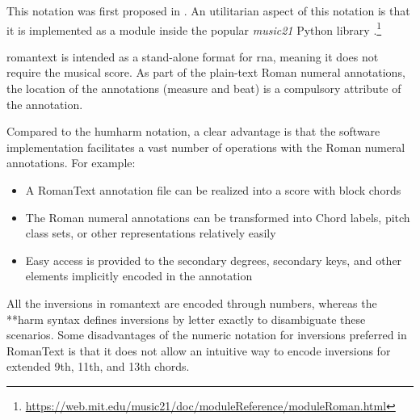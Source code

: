 

This notation was first proposed in
\textcite{gotham2019romantext}. An utilitarian aspect of
this notation is that it is implemented as a module inside
the popular \emph{music21} Python library
\parencite{cuthbert2010music21}.\footnote{\href{https://web.mit.edu/music21/doc/moduleReference/moduleRoman.html}{https://web.mit.edu/music21/doc/moduleReference/moduleRoman.html}}


\gls{romantext} is intended as a stand-alone format for
\gls{rna}, meaning it does not require the musical score. As
part of the plain-text Roman numeral annotations, the
location of the annotations (measure and beat) is a
compulsory attribute of the annotation.

Compared to the \gls{humharm} notation, a clear advantage is
that the software implementation facilitates a vast number
of operations with the Roman numeral annotations. For
example:

\begin{itemize}
    \item A RomanText annotation file can be realized into a
    score with block chords
    \item The Roman numeral annotations can be transformed
    into Chord labels, pitch class sets, or other
    representations relatively easily
    \item Easy access is provided to the secondary degrees,
    secondary keys, and other elements implicitly encoded in
    the annotation
\end{itemize}

All the inversions in \gls{romantext} are encoded through
numbers, whereas the **harm syntax defines inversions by
letter exactly to disambiguate these scenarios. Some
disadvantages of the numeric notation for inversions
preferred in RomanText is that it does not allow an
intuitive way to encode inversions for extended 9th, 11th,
and 13th chords. 
